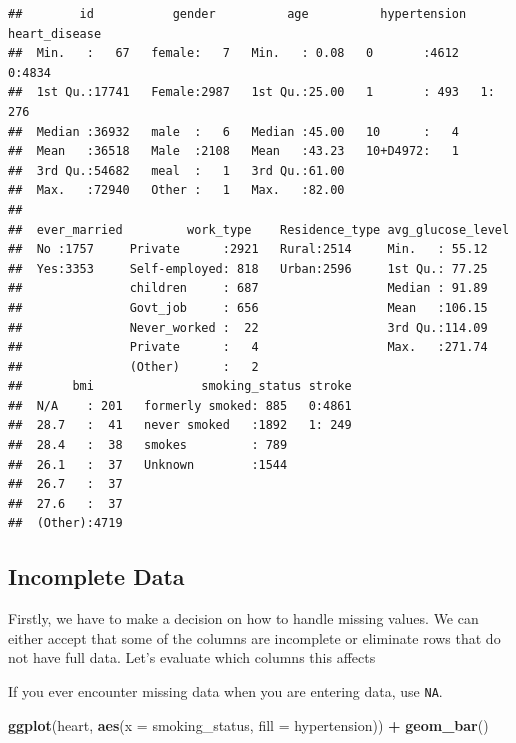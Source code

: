\documentclass[
]{book}
\newenvironment{Shaded}{\begin{snugshade}}{\end{snugshade}}
\newcommand{\AttributeTok}[1]{\textcolor[rgb]{0.13,0.29,0.53}{#1}}
\newcommand{\FunctionTok}[1]{\textcolor[rgb]{0.13,0.29,0.53}{\textbf{#1}}}
\newcommand{\NormalTok}[1]{#1}
\newcommand{\SpecialCharTok}[1]{\textcolor[rgb]{0.81,0.36,0.00}{\textbf{#1}}}
\begin{document}
\begin{verbatim}
##        id           gender          age          hypertension  heart_disease
##  Min.   :   67   female:   7   Min.   : 0.08   0       :4612   0:4834       
##  1st Qu.:17741   Female:2987   1st Qu.:25.00   1       : 493   1: 276       
##  Median :36932   male  :   6   Median :45.00   10      :   4                
##  Mean   :36518   Male  :2108   Mean   :43.23   10+D4972:   1                
##  3rd Qu.:54682   meal  :   1   3rd Qu.:61.00                                
##  Max.   :72940   Other :   1   Max.   :82.00                                
##                                                                             
##  ever_married         work_type    Residence_type avg_glucose_level
##  No :1757     Private      :2921   Rural:2514     Min.   : 55.12   
##  Yes:3353     Self-employed: 818   Urban:2596     1st Qu.: 77.25   
##               children     : 687                  Median : 91.89   
##               Govt_job     : 656                  Mean   :106.15   
##               Never_worked :  22                  3rd Qu.:114.09   
##               Private      :   4                  Max.   :271.74   
##               (Other)      :   2                                   
##       bmi               smoking_status stroke  
##  N/A    : 201   formerly smoked: 885   0:4861  
##  28.7   :  41   never smoked   :1892   1: 249  
##  28.4   :  38   smokes         : 789           
##  26.1   :  37   Unknown        :1544           
##  26.7   :  37                                  
##  27.6   :  37                                  
##  (Other):4719
\end{verbatim}

\subsection{Incomplete Data}\label{incomplete-data}

Firstly, we have to make a decision on how to handle missing values. We can either accept that some of the columns are incomplete or eliminate rows that do not have full data. Let's evaluate which columns this affects

If you ever encounter missing data when you are entering data, use \texttt{NA}.

\begin{Shaded}
\begin{Highlighting}[]
\FunctionTok{ggplot}\NormalTok{(heart, }\FunctionTok{aes}\NormalTok{(}\AttributeTok{x =}\NormalTok{ smoking\_status, }\AttributeTok{fill =}\NormalTok{ hypertension)) }\SpecialCharTok{+} 
  \FunctionTok{geom\_bar}\NormalTok{()}
\end{Highlighting}
\end{Shaded}
\end{document}
